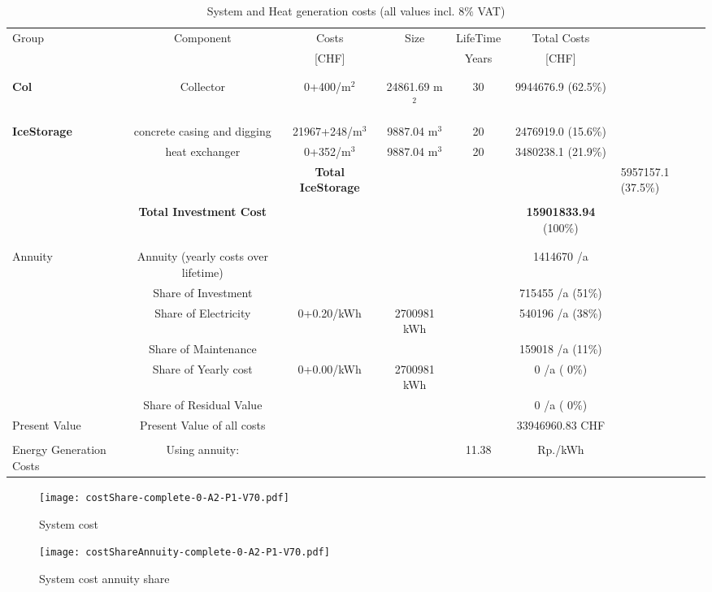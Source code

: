\documentclass[english]{SPFShortReport}
\begin{document}
\begin{table}[!ht]
\centering
\caption{System and Heat generation costs (all values incl. 8$\%$ VAT) }
\begin{adjustbox}{max width =\textwidth}
\begin{tabular}{l | c c c c c } 
\hline
\hline
Group &Component &Costs &Size &LifeTime &Total Costs \\ 
 & &[CHF] & &Years &[CHF]\\ 
\hline
\\
\hline \\
\textbf{Col} & Collector & 0+400/m$^2$ & 24861.69 m$^2$ & 30 & 9944676.9 (62.5\%) \\
\hline \\
\hline \\
\textbf{IceStorage} & concrete casing and digging & 21967+248/m$^3$ & 9887.04 m$^3$ & 20 & 2476919.0 (15.6\%) \\
 & heat exchanger & 0+352/m$^3$ & 9887.04 m$^3$ & 20 & 3480238.1 (21.9\%) \\
&
 & \textbf{Total IceStorage} & & & & 5957157.1 (37.5\%) \\
\hline \\
 & \textbf{Total Investment Cost} & & & & \textbf{15901833.94} (100\%) \\ 
\hline \\ 
\hline \\ 
Annuity & Annuity (yearly costs over lifetime)  &&& & 1414670 /a  \\
 & Share of Investment & &&& 715455 /a (51\%) \\
 & Share of Electricity & 0+0.20/kWh & 2700981 kWh &  & 540196 /a (38\%)\\
 & Share of Maintenance & &&& 159018 /a (11\%)\\ 
 & Share of Yearly cost & 0+0.00/kWh & 2700981 kWh & &  0 /a ( 0\%)\\
 & Share of Residual Value &&& &  0 /a ( 0\%)\\
Present Value  & Present Value of all costs  & &&& 33946960.83 CHF \\
\hline \\ 
 Energy Generation Costs & Using annuity: &&& 11.38 & Rp./kWh \\
\hline
\hline
\end{tabular}
\end{adjustbox}
\label{CostsTable}
\end{table}
\begin{figure}[!htbp]
\begin{center}
\texttt{[image: costShare-complete-0-A2-P1-V70.pdf]}
\caption{System cost}
\label{systemCost}
\end{center}
\end{figure}
\begin{figure}[!htbp]
\begin{center}
\texttt{[image: costShareAnnuity-complete-0-A2-P1-V70.pdf]}
\caption{System cost annuity share}
\label{systemCostannuity}
\end{center}
\end{figure}
\end{document}
